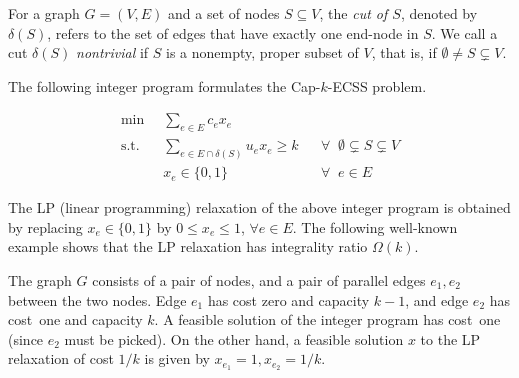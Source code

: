 \documentclass[11pt]{article}
\begin{document}
For a graph $G=(V,E)$ and a set of nodes $S\subseteq{V}$, the \textit{cut of $S$}, denoted by $\delta(S)$, refers to the set of edges that have exactly one end-node in $S$. We call a cut $\delta(S)$ \textit{nontrivial} if $S$ is a nonempty, proper subset of $V$, that is, if $\emptyset\neq{S}\subsetneq{V}$. 

The following integer program formulates the Cap-$k$-ECSS problem.

\begin{align*}\label{intro-IP:CapkECSS}
    \min\;\;&\sum_{e\in E}c_e x_e \tag{IP: CapkECSS}\\
    \text{s.t.}\;\;& \sum_{e\in E\cap \delta(S)} u_ex_e \geq k && \forall\;\; \emptyset\subsetneq S\subsetneq V \\
    &x_e\in \{0,1\} && \forall\;\; e\in{E}
\end{align*}

The LP (linear programming) relaxation of the above integer program
is obtained by replacing $x_e\in\{0,1\}$ by $0\leq x_e\leq 1$,
$\forall e\in{E}$.
The following well-known example shows that the LP relaxation has
integrality ratio $\Omega(k)$.

The graph $G$ consists of a pair of nodes, and a pair of parallel
edges $e_1, e_2$ between the two nodes.  Edge $e_1$ has cost zero
and capacity $k-1$, and edge $e_2$ has cost~one and capacity $k$.
A feasible solution of the integer program has cost~one (since $e_2$ must be picked).
On the other hand, a feasible solution $x$ to the LP relaxation of cost $1/k$ is given
by $x_{e_1}=1, x_{e_2}=1/k$.
\end{document}
